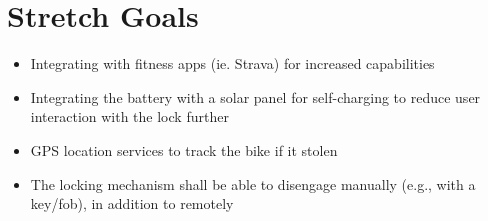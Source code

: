 \documentclass{article}
\begin{document}
\section{Stretch Goals}
\begin{itemize}
\item Integrating with fitness apps (ie. Strava) for increased capabilities
\item Integrating the battery with a solar panel for self-charging to reduce user interaction with the lock further
\item GPS location services to track the bike if it stolen
\item The locking mechanism shall be able to disengage manually (e.g., with a key/fob), in addition to remotely
\end{itemize}

\newpage


‌
‌
\end{document}
